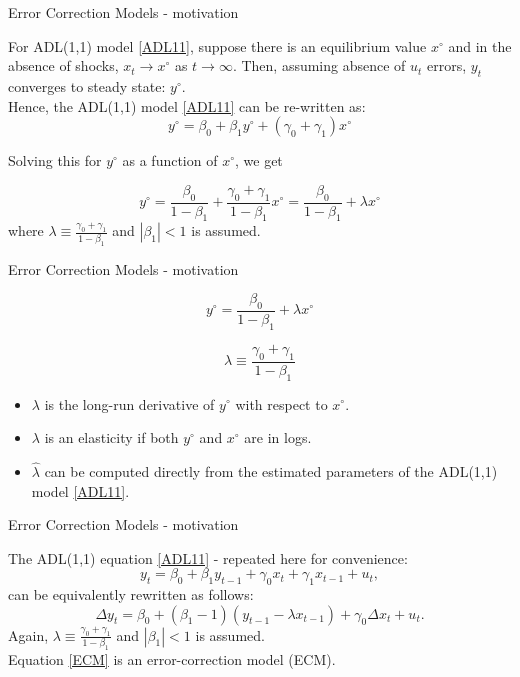 \documentclass{beamer}
\begin{document}
\begin{frame}{Error Correction Models - motivation}

For ADL(1,1) model \eqref{ADL11}, suppose there is an equilibrium value $x^{\circ}$ and in the absence of shocks, $x_t \rightarrow x^{\circ}$ as $t \rightarrow \infty$. Then, assuming absence of $u_t$ errors, $y_t$ converges to steady state: $y^{\circ}$.\\ 
\medskip
Hence, the ADL(1,1) model \eqref{ADL11} can be re-written as:
$$y^{\circ} = \beta_0 + \beta_1 y^{\circ} + (\gamma_0 + \gamma_1) x^{\circ}$$

Solving this for $y^{\circ}$ as a function of $x^{\circ}$, we get

$$ y^{\circ} = 
   \frac{\beta_0}{1 - \beta_1} + \frac{\gamma_0 + \gamma_1}{1 - \beta_1} x^{\circ} = 
   \frac{\beta_0}{1 - \beta_1} + \lambda x^{\circ}$$
where $ \lambda \equiv \frac{\gamma_0 + \gamma_1}{1 - \beta_1}$ and $|\beta_1|<1$ is assumed. \\


\end{frame}
\begin{frame}{Error Correction Models - motivation}

$$ y^{\circ} =  \frac{\beta_0}{1 - \beta_1} + \lambda x^{\circ}$$

$$ \lambda \equiv \frac{\gamma_0 + \gamma_1}{1 - \beta_1}$$

\begin{itemize}
\item $\lambda$ is the long-run derivative of $y^{\circ}$ with respect to $x^{\circ}$.
\medskip
\item $\lambda$ is an elasticity if both $y^{\circ}$ and $x^{\circ}$ are in logs.
\medskip
\item $\hat{\lambda}$ can be computed directly from the estimated parameters of the ADL(1,1) model \eqref{ADL11}.
\end{itemize}


\end{frame}
\begin{frame}{Error Correction Models - motivation}

The ADL(1,1) equation \eqref{ADL11} - repeated here for convenience:
\begin{equation*}
y_t = \beta_0 + \beta_1 y_{t-1} + 
         \gamma_0 x_t + \gamma_1 x_{t-1} + u_t,
\end{equation*}
can be equivalently rewritten as follows:
\begin{equation} \label{ECM}
\Delta y_t = \beta_0 + (\beta_1 -1) ( y_{t-1} - \lambda x_{t-1} ) + 
         \gamma_0 \Delta x_t + u_t.
\end{equation}
Again, $ \lambda \equiv \frac{\gamma_0 + \gamma_1}{1 - \beta_1}$ and $|\beta_1| < 1$ is assumed. \\
\medskip
Equation \eqref{ECM} is an error-correction model (ECM).
\end{frame}
\end{document}
